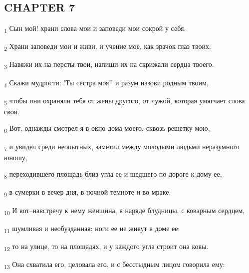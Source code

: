 \subsection{CHAPTER 7}
\begin{tcolorbox}
\textsubscript{1} Сын мой! храни слова мои и заповеди мои сокрой у себя.
\end{tcolorbox}
\begin{tcolorbox}
\textsubscript{2} Храни заповеди мои и живи, и учение мое, как зрачок глаз твоих.
\end{tcolorbox}
\begin{tcolorbox}
\textsubscript{3} Навяжи их на персты твои, напиши их на скрижали сердца твоего.
\end{tcolorbox}
\begin{tcolorbox}
\textsubscript{4} Скажи мудрости: 'Ты сестра моя!' и разум назови родным твоим,
\end{tcolorbox}
\begin{tcolorbox}
\textsubscript{5} чтобы они охраняли тебя от жены другого, от чужой, которая умягчает слова свои.
\end{tcolorbox}
\begin{tcolorbox}
\textsubscript{6} Вот, однажды смотрел я в окно дома моего, сквозь решетку мою,
\end{tcolorbox}
\begin{tcolorbox}
\textsubscript{7} и увидел среди неопытных, заметил между молодыми людьми неразумного юношу,
\end{tcolorbox}
\begin{tcolorbox}
\textsubscript{8} переходившего площадь близ угла ее и шедшего по дороге к дому ее,
\end{tcolorbox}
\begin{tcolorbox}
\textsubscript{9} в сумерки в вечер дня, в ночной темноте и во мраке.
\end{tcolorbox}
\begin{tcolorbox}
\textsubscript{10} И вот--навстречу к нему женщина, в наряде блудницы, с коварным сердцем,
\end{tcolorbox}
\begin{tcolorbox}
\textsubscript{11} шумливая и необузданная; ноги ее не живут в доме ее:
\end{tcolorbox}
\begin{tcolorbox}
\textsubscript{12} то на улице, то на площадях, и у каждого угла строит она ковы.
\end{tcolorbox}
\begin{tcolorbox}
\textsubscript{13} Она схватила его, целовала его, и с бесстыдным лицом говорила ему:
\end{tcolorbox}
